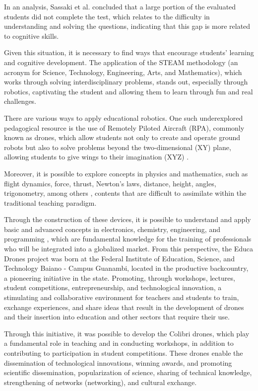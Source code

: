 \documentclass[conference]{IEEEtran}
\begin{document}
In an analysis, Sassaki et al. \cite{a2} concluded that a large portion of the evaluated students did not complete the test, which relates to the difficulty in understanding and solving the questions, indicating that this gap is more related to cognitive skills.

Given this situation, it is necessary to find ways that encourage students’ learning and cognitive development. The application of the STEAM methodology (an acronym for Science, Technology, Engineering, Arts, and Mathematics), which works through solving interdisciplinary problems, stands out, especially through robotics, captivating the student and allowing them to learn through fun and real challenges.

There are various ways to apply educational robotics. One such underexplored pedagogical resource is the use of Remotely Piloted Aircraft (RPA), commonly known as drones, which allow students not only to create and operate ground robots but also to solve problems beyond the two-dimensional (XY) plane, allowing students to give wings to their imagination (XYZ) \cite{a3}.

Moreover, it is possible to explore concepts in physics and mathematics, such as flight dynamics, force, thrust, Newton's laws, distance, height, angles, trigonometry, among others \cite{b11}, contents that are difficult to assimilate within the traditional teaching paradigm.

Through the construction of these devices, it is possible to understand and apply basic and advanced concepts in electronics, chemistry, engineering, and programming \cite{b12}, which are fundamental knowledge for the training of professionals who will be integrated into a globalized market. From this perspective, the Educa Drones project was born at the Federal Institute of Education, Science, and Technology Baiano - Campus Guanambi, located in the productive backcountry, a pioneering initiative in the state. Promoting, through workshops, lectures, student competitions, entrepreneurship, and technological innovation, a stimulating and collaborative environment for teachers and students to train, exchange experiences, and share ideas that result in the development of drones and their insertion into education and other sectors that require their use.

Through this initiative, it was possible to develop the Colibri drones, which play a fundamental role in teaching and in conducting workshops, in addition to contributing to participation in student competitions. These drones enable the dissemination of technological innovations, winning awards, and promoting scientific dissemination, popularization of science, sharing of technical knowledge, strengthening of networks (networking), and cultural exchange.
\end{document}
